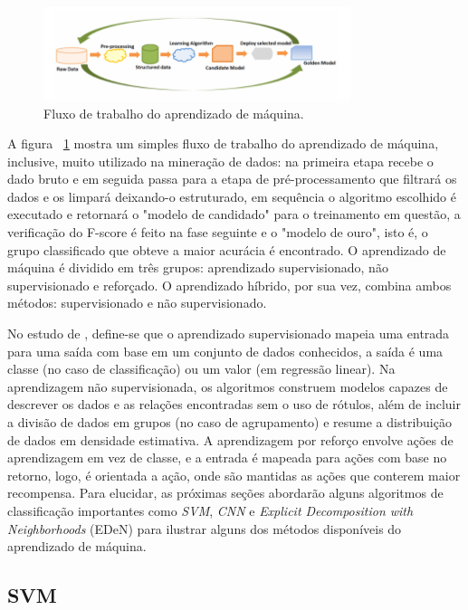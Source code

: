 \begin{figure}[h]
    \centering
    \includegraphics[width=0.8\textwidth]{images/workflow.png}
    \caption{Fluxo de trabalho do aprendizado de máquina.}
    \label{fig:workflow}
\end{figure}

A figura ~\ref{fig:workflow} mostra um simples fluxo de trabalho do aprendizado de máquina, inclusive, muito utilizado na mineração de dados: na primeira etapa recebe o dado bruto e em seguida passa para a etapa de pré-processamento que filtrará os dados e os limpará deixando-o estruturado, em sequência o algoritmo escolhido é executado e retornará o "modelo de candidado" para o treinamento em questão, a verificação do F-score é feito na fase seguinte e o "modelo de ouro", isto é, o grupo classificado que obteve a maior acurácia é encontrado. \cite{ml-intro}
O aprendizado de máquina é dividido em três grupos: aprendizado supervisionado, não supervisionado e reforçado. O aprendizado híbrido, por sua vez, combina ambos métodos: supervisionado e não supervisionado.

No estudo de \cite{ml-intro}, define-se que o aprendizado supervisionado mapeia uma entrada para uma saída com base em um conjunto de dados conhecidos, a saída é uma classe (no caso de classificação) ou um valor (em regressão linear). Na aprendizagem não supervisionada, os algoritmos construem modelos capazes de descrever os dados e as relações encontradas sem o uso de rótulos, além de incluir a divisão de dados em grupos (no caso de agrupamento) e resume a distribuição de dados em densidade estimativa. A aprendizagem por reforço envolve ações de aprendizagem em vez de classe, e a entrada é mapeada para ações com base no retorno, logo, é orientada a ação, onde são mantidas as ações que conterem maior recompensa. Para elucidar, as próximas seções abordarão alguns algoritmos de classificação importantes como \textit{SVM}, \textit{CNN} e \textit{Explicit Decomposition with Neighborhoods} (EDeN) para ilustrar alguns dos métodos disponíveis do aprendizado de máquina.

\subsection{SVM}

